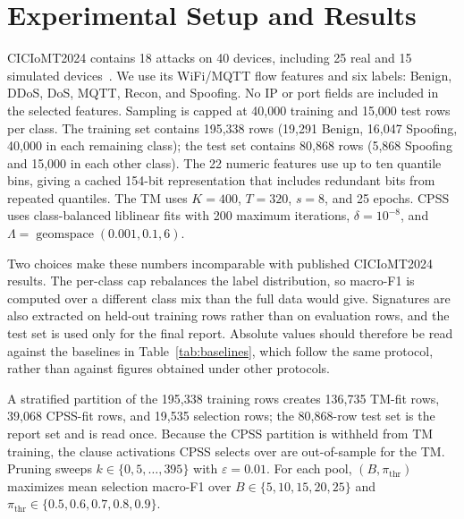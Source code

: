 \documentclass[conference]{IEEEtran}
\begin{document}
\section{Experimental Setup and Results}
\label{sec:setup}
CICIoMT2024 contains 18 attacks on 40 devices, including 25 real
and 15 simulated devices~\cite{dadkhah2024}. We use its WiFi/MQTT
flow features and six labels: Benign, DDoS, DoS, MQTT, Recon, and
Spoofing. No IP or port fields are included in the selected features.
Sampling is capped at 40,000 training and 15,000 test rows per class.
The training set contains 195,338 rows (19,291 Benign, 16,047
Spoofing, 40,000 in each remaining class); the test set contains
80,868 rows (5,868 Spoofing and 15,000 in each other class).
The 22 numeric features use up to ten quantile bins, giving a cached
154-bit representation that includes redundant bits from repeated
quantiles. The TM uses $K=400$, $T=320$, $s=8$, and 25 epochs.
CPSS uses class-balanced liblinear fits with 200 maximum iterations,
$\delta=10^{-8}$, and $\Lambda=\operatorname{geomspace}(0.001,0.1,6)$.

Two choices make these numbers incomparable with published
CICIoMT2024 results. The per-class cap rebalances the label
distribution, so macro-F1 is computed over a different class mix than
the full data would give. Signatures are also extracted on held-out
training rows rather than on evaluation rows, and the test set is used
only for the final report. Absolute values should therefore be read
against the baselines in Table~\ref{tab:baselines}, which follow the
same protocol, rather than against figures obtained under other
protocols.

A stratified partition of the 195,338 training rows creates 136,735
TM-fit rows, 39,068 CPSS-fit rows, and 19,535 selection rows; the
80,868-row test set is the report set and is read once. Because the
CPSS partition is withheld from TM training, the clause activations
CPSS selects over are out-of-sample for the TM.
Pruning sweeps $k\in\{0,5,\ldots,395\}$ with $\varepsilon=0.01$.
For each pool, $(B,\pi_{\mathrm{thr}})$ maximizes mean selection
macro-F1 over $B\in\{5,10,15,20,25\}$ and
$\pi_{\mathrm{thr}}\in\{0.5,0.6,0.7,0.8,0.9\}$.
\end{document}
